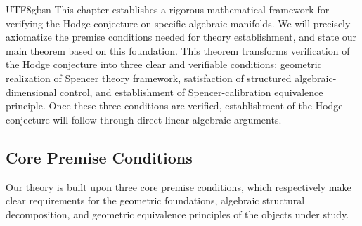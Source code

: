 \documentclass[a4paper,12pt]{extarticle}
\theoremstyle{definition}
\begin{document}
\begin{CJK}{UTF8}{gbsn}
This chapter establishes a rigorous mathematical framework for verifying the Hodge conjecture on specific algebraic manifolds. We will precisely axiomatize the premise conditions needed for theory establishment, and state our main theorem based on this foundation. This theorem transforms verification of the Hodge conjecture into three clear and verifiable conditions: geometric realization of Spencer theory framework, satisfaction of structured algebraic-dimensional control, and establishment of Spencer-calibration equivalence principle. Once these three conditions are verified, establishment of the Hodge conjecture will follow through direct linear algebraic arguments.

\subsection{Core Premise Conditions}
\label{subsec:core_hypotheses}

Our theory is built upon three core premise conditions, which respectively make clear requirements for the geometric foundations, algebraic structural decomposition, and geometric equivalence principles of the objects under study.


\end{CJK}
\end{document}
